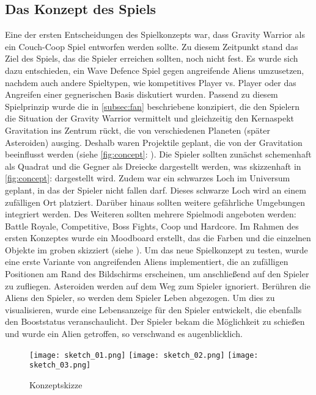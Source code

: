 \documentclass[11pt]{scrartcl}
\begin{document}
\subsection{Das Konzept des Spiels}
Eine der ersten Entscheidungen des Spielkonzepts war, dass Gravity Warrior als ein Couch-Coop Spiel entworfen werden sollte. Zu diesem Zeitpunkt stand das Ziel des Spiels, das die Spieler erreichen sollten, noch nicht fest. Es wurde sich dazu entschieden, ein Wave Defence Spiel gegen angreifende Aliens umzusetzen, nachdem auch andere Spieltypen, wie kompetitives Player vs. Player oder das Angreifen einer gegnerischen Basis diskutiert wurden.
Passend zu diesem Spielprinzip wurde die in \autoref{subsec:fan} beschriebene  konzipiert, die den Spielern die Situation der Gravity Warrior vermittelt und gleichzeitig den Kernaspekt Gravitation ins Zentrum rückt, die von verschiedenen Planeten (später Asteroiden) ausging. Deshalb waren Projektile geplant, die von der Gravitation beeinflusst werden (siehe \autoref{fig:concept}: ). 
Die Spieler sollten zunächst schemenhaft als Quadrat und die Gegner als Dreiecke dargestellt werden, was skizzenhaft in \autoref{fig:concept}:  dargestellt wird. Zudem war ein schwarzes Loch im Universum geplant, in das der Spieler nicht fallen darf. Dieses schwarze Loch wird an einem zufälligen Ort platziert. Darüber hinaus sollten weitere gefährliche Umgebungen integriert werden. Des Weiteren sollten mehrere Spielmodi angeboten werden: Battle Royale, Competitive, Boss Fights, Coop und Hardcore. Im Rahmen des ersten Konzeptes wurde ein Moodboard erstellt, das die Farben und die einzelnen Objekte im groben skizziert (siehe ).
Um das neue Spielkonzept zu testen, wurde eine erste Variante von angreifenden Aliens implementiert, die an zufälligen Positionen am Rand des Bildschirms erscheinen, um anschließend auf den Spieler zu zufliegen. Asteroiden werden auf dem Weg zum Spieler ignoriert. Berühren die Aliens den Spieler, so werden dem Spieler Leben abgezogen. Um dies zu visualisieren, wurde eine Lebensanzeige für den Spieler entwickelt, die ebenfalls den Booststatus veranschaulicht.
Der Spieler bekam die Möglichkeit zu schießen und wurde ein Alien getroffen, so verschwand es augenblicklich.

\begin{figure}[htp]
	\centering
	\texttt{[image: sketch\_01.png]}\hfill
	\texttt{[image: sketch\_02.png]}\hfill
	\texttt{[image: sketch\_03.png]}
	\caption{Konzeptskizze}
	\label{fig:concept}
\end{figure}
\end{document}
